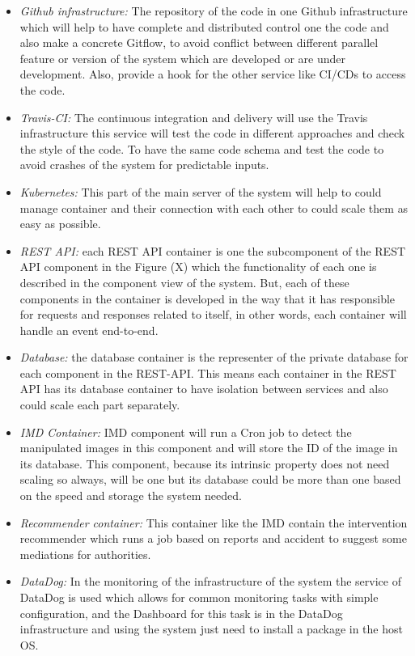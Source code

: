\begin{itemize}
\item \emph{Github infrastructure:} The repository of the code in one Github infrastructure which will help to have complete and distributed control one the code and also make a concrete Gitflow, to avoid conflict between different parallel feature or version of the system which are developed or are under development. Also, provide a hook for the other service like CI/CDs to access the code.\\
\item \emph{Travis-CI:} The continuous integration and delivery will use the Travis infrastructure this service will test the code in different approaches and check the style of the code. To have the same code schema and test the code to avoid crashes of the system for predictable inputs.
\item \emph{Kubernetes:} This part of the main server of the system will help to could manage container and their connection with each other to could scale them as easy as possible.
\item \emph{REST API:} each REST API container is one the subcomponent of the REST API component in the Figure (X) which the functionality of each one is described in the component view of the system. But, each of these components in the container is developed in the way that it has responsible for requests and responses related to itself, in other words, each container will handle an event end-to-end.
\item \emph{Database:} the database container is the representer of the private database for each component in the REST-API. This means each container in the REST API has its database container to have isolation between services and also could scale each part separately.
\item \emph{IMD Container:} IMD component will run a Cron job to detect the manipulated images in this component and will store the ID of the image in its database. This component, because its intrinsic property does not need scaling so always, will be one but its database could be more than one based on the speed and storage the system needed.
\item \emph{Recommender container:} This container like the IMD contain the intervention recommender which runs a job based on reports and accident to suggest some mediations for authorities.
\item \emph{DataDog:} In the monitoring of the infrastructure of the system the service of DataDog is used which allows for common monitoring tasks with simple configuration, and the Dashboard for this task is in the DataDog infrastructure and using the system just need to install a package in the host OS.

\end{itemize}
